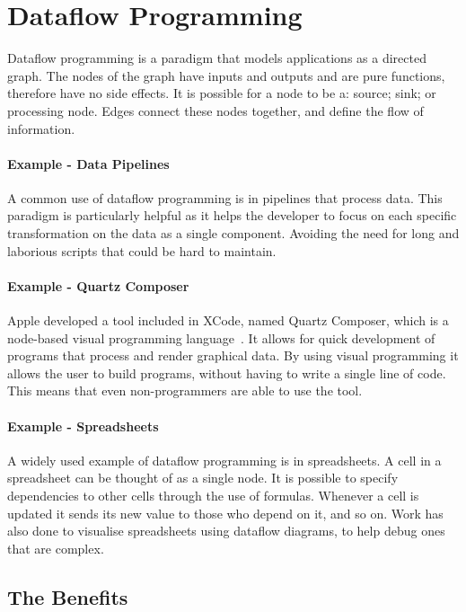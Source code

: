 \documentclass[
author={Riley Evans},
supervisor={Dr. Meng Wang},
degree={MEng},
title={\vbox{Circuit: A Domain Specific Language for Dataflow Programming}},
subtitle={},
type={research},
year={2021}
]{dissertation}
\begin{document}
\section{Dataflow Programming}
Dataflow programming is a paradigm that models applications as a directed graph.
The nodes of the graph have inputs and outputs and are pure functions, therefore have no side effects.
It is possible for a node to be a: source; sink; or processing node.
Edges connect these nodes together, and define the flow of information.


\paragraph{Example - Data Pipelines}
A common use of dataflow programming is in pipelines that process data.
This paradigm is particularly helpful as it helps the developer to focus on each specific transformation on the data as a single component.
Avoiding the need for long and laborious scripts that could be hard to maintain.

\paragraph{Example - Quartz Composer}
Apple developed a tool included in XCode, named Quartz Composer, which is a node-based visual programming language~\cite{quartz}.
It allows for quick development of programs that process and render graphical data.
By using visual programming it allows the user to build programs, without having to write a single line of code.
This means that even non-programmers are able to use the tool.

\paragraph{Example - Spreadsheets}
A widely used example of dataflow programming is in spreadsheets.
A cell in a spreadsheet can be thought of as a single node.
It is possible to specify dependencies to other cells through the use of formulas.
Whenever a cell is updated it sends its new value to those who depend on it, and so on.
Work has also done to visualise spreadsheets using dataflow diagrams, to help debug ones that are complex\cite{hermans2011breviz}.


\subsection{The Benefits}
\end{document}
